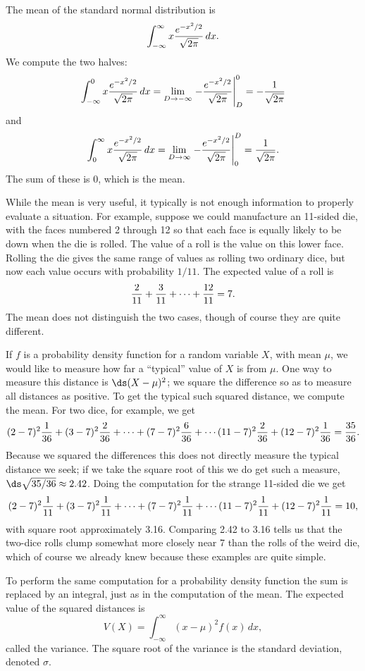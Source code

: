 \begin{example}
The mean of the standard normal distribution is 
$$\int_{-\infty}^\infty x {e^{-x^2/2}\over\sqrt{2\pi}}\,dx.$$
We compute the two halves:
$$
  \int_{-\infty}^0 x{e^{-x^2/2}\over\sqrt{2\pi}}\,dx=
  \lim_{D\to-\infty}\left.-{e^{-x^2/2}\over\sqrt{2\pi}}\right|_D^0=
  -{1\over\sqrt{2\pi}}
$$
and 
$$
  \int_0^\infty x{e^{-x^2/2}\over\sqrt{2\pi}}\,dx=
  \lim_{D\to\infty}\left.-{e^{-x^2/2}\over\sqrt{2\pi}}\right|_0^D=
  {1\over\sqrt{2\pi}}.
$$
The sum of these is 0, which is the mean.
\end{example}

While the mean is very useful, it typically is not enough information
to properly evaluate a situation. For example, suppose we could
manufacture an 11-sided die, with the faces numbered 2 through 12 so
that each face is equally likely to be down when the die is
rolled. The value of a roll is the value on this lower face.  Rolling
the die gives the same range of values as rolling two ordinary dice,
but now each value occurs with probability $1/11$. The expected value
of a roll is
$$ {2\over 11} + {3\over 11} + \cdots + {12\over 11} = 7.$$
The mean does not distinguish the two cases, though of course they are
quite different.

If $f$ is a probability density function for a random variable $X$,
with mean $\mu$, we would like to measure how far a ``typical'' value
of $X$ is from $\mu$. One way to measure this distance is
$\ds(X-\mu)^2$; we square the difference so as to measure all
distances as positive. To get the typical such squared distance, we
compute the mean. For two dice, for example, we get
$$
  (2-7)^2{1\over 36} + (3-7)^2{2\over 36} + \cdots + (7-7)^2{6\over 36}
  +\cdots (11-7)^2{2\over36} + (12-7)^2{1\over36} = {35\over36}.
$$
Because we squared the differences this does not directly measure the
typical distance we seek; if we take the square root of this we do get
such a measure, $\ds\sqrt{35/36}\approx 2.42$. Doing the computation
for the strange 11-sided die we get
$$
  (2-7)^2{1\over 11} + (3-7)^2{1\over 11} + \cdots + (7-7)^2{1\over 11}
  +\cdots (11-7)^2{1\over11} + (12-7)^2{1\over11} = 10,
$$
with square root approximately 3.16. Comparing 2.42 to 3.16 tells us
that the two-dice rolls clump somewhat more closely near 7
than the rolls of the weird die, which of course we
already knew because these examples are quite simple.

To perform the same computation for a probability density function the
sum is replaced by an integral, just as in the computation of the
mean. The expected value of the squared distances is
$$V(X)= \int_{-\infty }^\infty (x-\mu)^2 f(x)\,dx,$$
called the {\dfont variance\/}. The square root of the
variance is the {\dfont standard deviation\/}, denoted $\sigma$.

